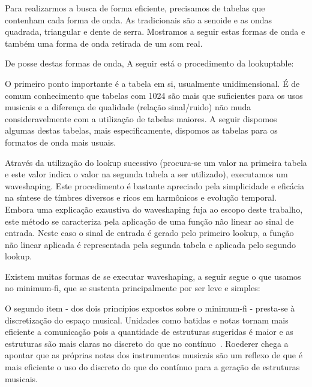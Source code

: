 Para realizarmos a busca de forma eficiente, precisamos de tabelas que
contenham cada forma de onda. As tradicionais são a senoide e
as ondas quadrada, triangular e dente de serra.  Mostramos a seguir
estas formas de onda e também uma forma de onda retirada de um som
real.

De posse destas formas de onda, A seguir está o procedimento da
lookuptable:


O primeiro ponto importante é a tabela em si, usualmente
unidimensional. É de comum conhecimento que tabelas com 1024 são mais
que suficientes para os usos musicais e a diferença de qualidade
(relação sinal/ruido) não muda consideravelmente com a utilização de
tabelas maiores. A seguir dispomos algumas destas tabelas, mais
especificamente, dispomos as tabelas para os formatos de onda mais
usuais.


Através da utilização do lookup sucessivo (procura-se um valor na primeira tabela
e este valor indica o valor na segunda tabela a ser utilizado), executamos
um waveshaping. Este procedimento é bastante apreciado pela simplicidade e eficácia
na síntese de tímbres diversos e ricos em harmônicos e evolução temporal. Embora
uma explicação exaustiva do waveshaping fuja ao escopo deste trabalho, este
método se caracteriza pela aplicação de uma função não linear ao sinal de entrada.
Neste caso o sinal de entrada é gerado pelo primeiro lookup, a função não linear aplicada
é representada pela segunda tabela e aplicada pelo segundo lookup.

Existem muitas formas de se executar waveshaping, a seguir segue o que usamos no minimum-fi, que se sustenta principalmente por ser leve e simples:


O segundo item - dos dois princípios expostos sobre o minimum-fi - presta-se à discretização do espaço musical. Unidades como batidas e notas
tornam mais eficiente a comunicação pois a quantidade
de estruturas sugeridas é maior e as estruturas são mais claras no discreto do que no contínuo~\cite{Roederer}. Roederer chega a
apontar que as próprias notas dos instrumentos musicais são um reflexo de que é mais eficiente
o uso do discreto do que do contínuo para a geração de estruturas musicais.

